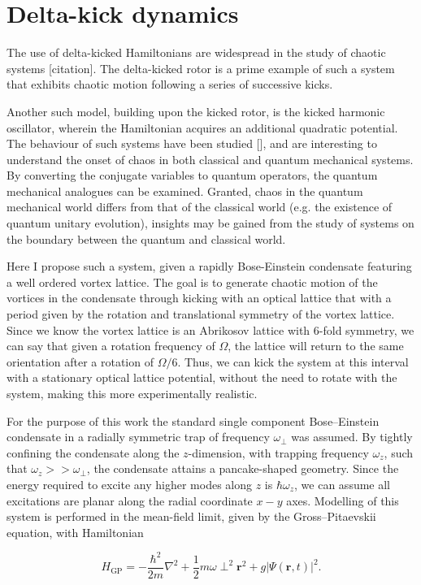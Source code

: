 \section{Delta-kick dynamics}
The use of delta-kicked Hamiltonians are widespread in the study of chaotic systems [citation]. The delta-kicked rotor is a prime example of such a system that exhibits chaotic motion following a series of successive kicks.

Another such model, building upon the kicked rotor, is the kicked harmonic oscillator, wherein the Hamiltonian acquires an additional quadratic potential. The behaviour of such systems have been studied [], and are interesting to understand the onset of chaos in both classical and quantum mechanical systems. By converting the conjugate variables to quantum operators, the quantum mechanical analogues can be examined. Granted, chaos in the quantum mechanical world differs from that of the classical world (e.g. the existence of quantum unitary evolution), insights may be gained from the study of systems on the boundary between the quantum and classical world.

Here I propose such a system, given a rapidly Bose-Einstein condensate featuring a well ordered vortex lattice. The goal is to generate chaotic motion of the vortices in the condensate through kicking with an optical lattice that with a period given by the rotation and translational symmetry of the vortex lattice. Since we know the vortex lattice is an Abrikosov lattice with 6-fold symmetry, we can say that given a rotation frequency of $\Omega$, the lattice will return to the same orientation after a rotation of $\Omega/6$. Thus, we can kick the system at this interval with a stationary optical lattice potential, without the need to rotate with the system, making this more experimentally realistic.


For the purpose of this work the standard single component Bose--Einstein condensate in a radially symmetric trap of frequency $\omega_\perp$ was assumed. By tightly confining the condensate along the $z$-dimension, with trapping frequency $\omega_z$, such that $\omega_z >> \omega_\perp$, the condensate attains a pancake-shaped geometry. Since the energy required to excite any higher modes along $z$ is $\hbar\omega_z$, we can assume all excitations are planar along the radial coordinate $x-y$ axes. Modelling of this system is performed in the  mean-field limit, given by the Gross--Pitaevskii equation, with Hamiltonian

\begin{equation}\label{eqn:gpe_h0}
	H_{\mathrm{GP}} = -\frac{\hbar^2}{2m}\nabla^2 + \frac{1}{2}m\omega\perp^2\mathbf{r}^2 + g\vert\Psi(\mathbf{r},t)\vert^2.
\end{equation}

